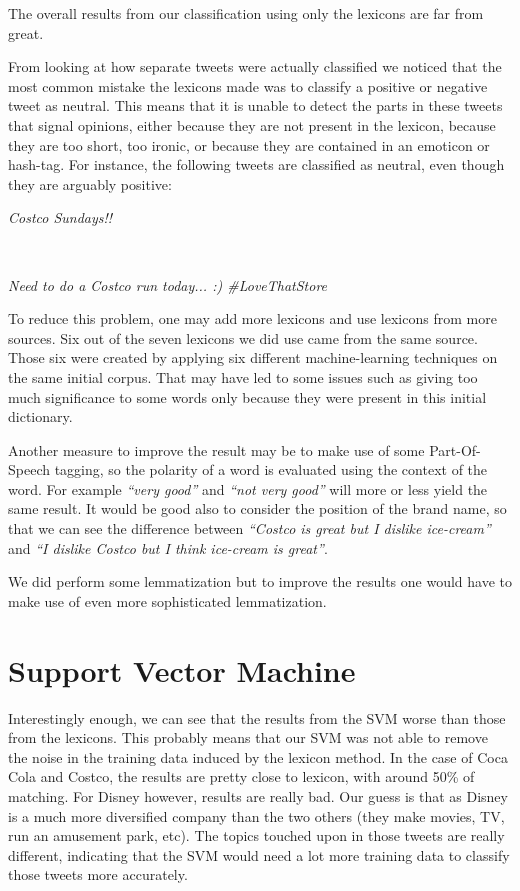 \documentclass[a4paper,12pt]{report}
\begin{document}
The overall results from our classification using only the lexicons are far from great. 

From looking at how separate tweets were actually classified we noticed that the most common mistake the lexicons made was to classify a positive or negative tweet as neutral. 
This means that it is unable to detect the parts in these tweets that signal opinions, either because they are not present in the lexicon, because they are too short, too ironic, or because they are contained in an emoticon or hash-tag.
For instance, the following tweets are classified as neutral, even though they are arguably positive:
\\
\centerline{\textit{Costco Sundays!!}}\\
\centerline{\textit{Need to do a Costco run today... :) \#LoveThatStore}}

To reduce this problem, one may add more lexicons and use lexicons from more sources. Six out of the seven lexicons we did use came from the same source. Those six were created by applying six different machine-learning techniques on the same initial corpus. That may have led to some issues such as giving too much significance to some words only because they were present in this initial dictionary.

Another measure to improve the result may be to make use of some Part-Of-Speech tagging, so the polarity of a word is evaluated using the context of the word. For example \emph{``very good''} and \emph{``not very good''} will more or less yield the same result. It would be good also to consider the position of the brand name, so that we can see the difference between \emph{``Costco is great but I dislike ice-cream''} and \emph{``I dislike Costco but I think ice-cream is great''}.

We did perform some lemmatization but to improve the results one would have to make use of even more sophisticated lemmatization.

\section{Support Vector Machine}

Interestingly enough, we can see that the results from the SVM worse than those from the lexicons.
This probably means that our SVM was not able to remove the noise in the training data induced by the lexicon method.
In the case of Coca Cola and Costco, the results are pretty close to lexicon, with around 50\% of matching.
For Disney however, results are really bad. 
Our guess is that as Disney is a much more diversified company than the two others (they make movies, TV, run an amusement park, etc). The topics touched upon in those tweets are really different, indicating that the SVM would need a lot more training data to classify those tweets more accurately.
\end{document}

